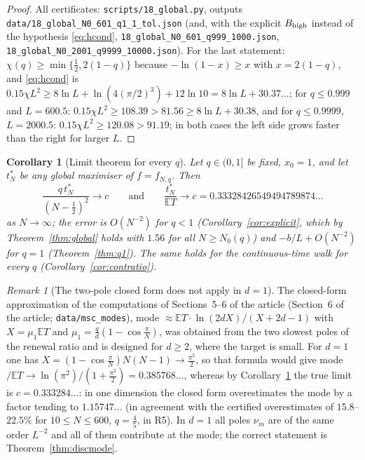 \documentclass[11pt,a4paper]{article}
\newtheorem{corollary}[theorem]{Corollary}
\theoremstyle{definition}
\theoremstyle{remark}
\newtheorem{remark}[theorem]{Remark}
\newcommand{\E}{\mathbb{E}}
\begin{document}
\begin{proof}
All certificates: \texttt{scripts/18\_global.py}, outputs \texttt{data/18\_global\_N0\_601\_q1\_1\_tol.json} (and, with
the explicit $B_{\rm high}$ instead of the hypothesis \eqref{eq:hcond},
\texttt{18\_global\_N0\_601\_q999\_1000.json}, \texttt{18\_global\_N0\_2001\_q9999\_10000.json}). For the last
statement: $\chi(q)\ge\min\{\frac12,2(1-q)\}$ because $-\ln(1-x)\ge x$ with $x=2(1-q)$, and \eqref{eq:hcond} is
$0.15\chi L^2\ge8\ln L+\ln(4(\pi/2)^3)+12\ln10=8\ln L+30.37\ldots$; for $q\le0.999$ and $L=600.5$:
$0.15\chi L^2\ge108.39>81.56\ge8\ln L+30.38$, and for $q\le0.9999$, $L=2000.5$: $0.15\chi L^2\ge120.08>91.19$; in both
cases the left side grows faster than the right for larger $L$. %
\end{proof}

\begin{corollary}[Limit theorem for every $q$]\label{cor:limit}
Let $q\in(0,1]$ be fixed, $x_0=1$, and let $t_N^*$ be any global maximiser of $f=f_{N,q}$. Then
\[
   \frac{q\,t^*_N}{(N-\frac12)^2}\longrightarrow c\qquad\text{and}\qquad\frac{t_N^*}{\E T}\longrightarrow c=0.33328426549494789874\ldots
\]
as $N\to\infty$; the error is $O(N^{-2})$ for $q<1$ (Corollary~\ref{cor:explicit}, which by
Theorem~\ref{thm:global} holds with $1.56$ for all $N\ge N_0(q)$) and $-b/L+O(N^{-2})$ for $q=1$
(Theorem~\ref{thm:q1}). The same holds for the continuous-time walk for every $q$ (Corollary~\ref{cor:contratio}).
\end{corollary}

\begin{remark}[The two-pole closed form does not apply in $d=1$]\label{rem:closedform}
The closed-form approximation of the computations of Sections~5--6 of the article (Section~6 of the article; \texttt{data/msc\_modes}),
mode $\approx\E T\cdot\ln(2dX)/(X+2d-1)$ with $X=\mu_1\E T$ and $\mu_1=\frac qd(1-\cos\frac\pi N)$, was obtained from the
two slowest poles of the renewal ratio and is designed for $d\ge2$, where the target is small. For $d=1$ one has
$X=(1-\cos\frac\pi N)N(N-1)\to\frac{\pi^2}2$, so that formula would give
mode$/\E T\to\ln(\pi^2)/(1+\frac{\pi^2}2)=0.385768\ldots$, whereas by Corollary~\ref{cor:limit} the true limit is
$c=0.333284\ldots$: in one dimension the closed form overestimates the mode by a factor tending to $1.15747\ldots$
(in agreement with the certified overestimates of $15.8$--$22.5\%$ for $10\le N\le600$, $q=\frac45$, in
R5). In $d=1$ %
all poles $\nu_m$ are of the same order $L^{-2}$ and all of them contribute at the mode; the correct statement is
Theorem~\ref{thm:discmode}.
\end{remark}
\end{document}
